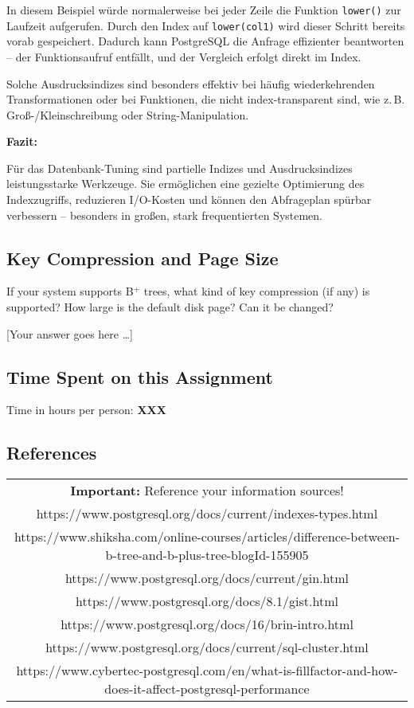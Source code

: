 \documentclass[11pt]{scrartcl}
\newcommand{\youranswerhere}{[Your answer goes here \ldots]}
\begin{document}
In diesem Beispiel würde normalerweise bei jeder Zeile die Funktion \texttt{lower()} zur Laufzeit aufgerufen. Durch den Index auf \texttt{lower(col1)} wird dieser Schritt bereits vorab gespeichert. Dadurch kann PostgreSQL die Anfrage effizienter beantworten – der Funktionsaufruf entfällt, und der Vergleich erfolgt direkt im Index.

Solche Ausdrucksindizes sind besonders effektiv bei häufig wiederkehrenden Transformationen oder bei Funktionen, die nicht index-transparent sind, wie z.\,B. Groß-/Kleinschreibung oder String-Manipulation.

\vspace{0.5em}
\noindent\textbf{Fazit:}

Für das Datenbank-Tuning sind partielle Indizes und Ausdrucksindizes leistungsstarke Werkzeuge. Sie ermöglichen eine gezielte Optimierung des Indexzugriffs, reduzieren I/O-Kosten und können den Abfrageplan spürbar verbessern – besonders in großen, stark frequentierten Systemen.

\subsection{Key Compression and Page Size}

If your system supports B$^+$ trees, what kind of key compression (if any) is supported? How large is the default disk page? Can it be changed?

\youranswerhere{}

\subsection*{Time Spent on this Assignment}

Time in hours per person: \textbf{XXX}

\subsection*{References}

\begin{table}[H]
  \centering
  \begin{tabular}{c}
    \hline
    \textbf{Important:} Reference your information sources! \tabularnewline
    https://www.postgresql.org/docs/current/indexes-types.html \tabularnewline
    https://www.shiksha.com/online-courses/articles/difference-between-b-tree-and-b-plus-tree-blogId-155905 \tabularnewline
    https://www.postgresql.org/docs/current/gin.html \tabularnewline
    https://www.postgresql.org/docs/8.1/gist.html \tabularnewline
    https://www.postgresql.org/docs/16/brin-intro.html \tabularnewline
    https://www.postgresql.org/docs/current/sql-cluster.html \tabularnewline
    https://www.cybertec-postgresql.com/en/what-is-fillfactor-and-how-does-it-affect-postgresql-performance \tabularnewline
    \hline
  \end{tabular}
\end{table}
\end{document}

